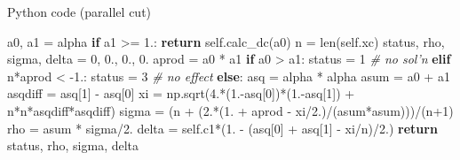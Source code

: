\documentclass[10pt,ignorenonframetext,serif,onlymath]{beamer}
\newenvironment{Shaded}{}{}
\newcommand{\BuiltInTok}[1]{#1}
\newcommand{\CommentTok}[1]{\textcolor[rgb]{0.38,0.63,0.69}{\textit{#1}}}
\newcommand{\ControlFlowTok}[1]{\textcolor[rgb]{0.00,0.44,0.13}{\textbf{#1}}}
\newcommand{\DecValTok}[1]{\textcolor[rgb]{0.25,0.63,0.44}{#1}}
\newcommand{\FloatTok}[1]{\textcolor[rgb]{0.25,0.63,0.44}{#1}}
\newcommand{\NormalTok}[1]{#1}
\newcommand{\OperatorTok}[1]{\textcolor[rgb]{0.40,0.40,0.40}{#1}}
\newcommand{\VariableTok}[1]{\textcolor[rgb]{0.10,0.09,0.49}{#1}}
\begin{document}
\begin{frame}[fragile]{Python code (parallel cut)}
\protect\hypertarget{sec:python-code-parallel-cut}{}

\begin{Shaded}
\begin{Highlighting}[]
\NormalTok{a0, a1 }\OperatorTok{=}\NormalTok{ alpha}
\ControlFlowTok{if}\NormalTok{ a1 }\OperatorTok{>=} \FloatTok{1.}\NormalTok{: }\ControlFlowTok{return} \VariableTok{self}\NormalTok{.calc_dc(a0)}
\NormalTok{n }\OperatorTok{=} \BuiltInTok{len}\NormalTok{(}\VariableTok{self}\NormalTok{.xc)}
\NormalTok{status, rho, sigma, delta }\OperatorTok{=} \DecValTok{0}\NormalTok{, }\FloatTok{0.}\NormalTok{, }\FloatTok{0.}\NormalTok{, }\FloatTok{0.}
\NormalTok{aprod }\OperatorTok{=}\NormalTok{ a0 }\OperatorTok{*}\NormalTok{ a1}
\ControlFlowTok{if}\NormalTok{ a0 }\OperatorTok{>}\NormalTok{ a1: }
\NormalTok{    status }\OperatorTok{=} \DecValTok{1} \CommentTok{# no sol'n}
\ControlFlowTok{elif}\NormalTok{ n}\OperatorTok{*}\NormalTok{aprod }\OperatorTok{<} \FloatTok{-1.}\NormalTok{: }
\NormalTok{    status }\OperatorTok{=} \DecValTok{3}  \CommentTok{# no effect}
\ControlFlowTok{else}\NormalTok{:}
\NormalTok{    asq }\OperatorTok{=}\NormalTok{ alpha }\OperatorTok{*}\NormalTok{ alpha}
\NormalTok{    asum }\OperatorTok{=}\NormalTok{ a0 }\OperatorTok{+}\NormalTok{ a1}
\NormalTok{    asqdiff }\OperatorTok{=}\NormalTok{ asq[}\DecValTok{1}\NormalTok{] }\OperatorTok{-}\NormalTok{ asq[}\DecValTok{0}\NormalTok{]}
\NormalTok{    xi }\OperatorTok{=}\NormalTok{ np.sqrt(}\FloatTok{4.}\OperatorTok{*}\NormalTok{(}\FloatTok{1.}\OperatorTok{-}\NormalTok{asq[}\DecValTok{0}\NormalTok{])}\OperatorTok{*}\NormalTok{(}\FloatTok{1.}\OperatorTok{-}\NormalTok{asq[}\DecValTok{1}\NormalTok{]) }\OperatorTok{+}\NormalTok{ n}\OperatorTok{*}\NormalTok{n}\OperatorTok{*}\NormalTok{asqdiff}\OperatorTok{*}\NormalTok{asqdiff)}
\NormalTok{    sigma }\OperatorTok{=}\NormalTok{ (n }\OperatorTok{+}\NormalTok{ (}\FloatTok{2.}\OperatorTok{*}\NormalTok{(}\FloatTok{1.} \OperatorTok{+}\NormalTok{ aprod }\OperatorTok{-}\NormalTok{ xi}\OperatorTok{/}\FloatTok{2.}\NormalTok{)}\OperatorTok{/}\NormalTok{(asum}\OperatorTok{*}\NormalTok{asum)))}\OperatorTok{/}\NormalTok{(n}\OperatorTok{+}\DecValTok{1}\NormalTok{)}
\NormalTok{    rho }\OperatorTok{=}\NormalTok{ asum }\OperatorTok{*}\NormalTok{ sigma}\OperatorTok{/}\FloatTok{2.}
\NormalTok{    delta }\OperatorTok{=} \VariableTok{self}\NormalTok{.c1}\OperatorTok{*}\NormalTok{(}\FloatTok{1.} \OperatorTok{-}\NormalTok{ (asq[}\DecValTok{0}\NormalTok{] }\OperatorTok{+}\NormalTok{ asq[}\DecValTok{1}\NormalTok{] }\OperatorTok{-}\NormalTok{ xi}\OperatorTok{/}\NormalTok{n)}\OperatorTok{/}\FloatTok{2.}\NormalTok{)        }
\ControlFlowTok{return}\NormalTok{ status, rho, sigma, delta}
\end{Highlighting}
\end{Shaded}

\end{frame}
\end{document}
